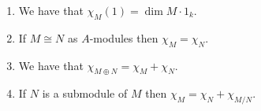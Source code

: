\begin{lemma}
  \leavevmode
  \label{lemma: properties of general characters}
  \begin{enumerate}
    \item
      We have that $\chi_M(1) = \dim M \cdot 1_k$.
    \item
      If $M \cong N$ as $A$-modules then $\chi_M = \chi_N$.
    \item
      \label{enumerate: character of direct sum}
      We have that $\chi_{M \oplus N} = \chi_M + \chi_N$.
    \item
      \label{enumerate: character of quotient}
      If $N$ is a submodule of $M$ then $\chi_M = \chi_N + \chi_{M/N}$.
  \end{enumerate}
\end{lemma}
